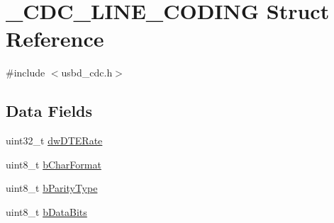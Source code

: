 \hypertarget{struct__CDC__LINE__CODING}{\section{\-\_\-\-C\-D\-C\-\_\-\-L\-I\-N\-E\-\_\-\-C\-O\-D\-I\-N\-G Struct Reference}
\label{struct__CDC__LINE__CODING}
}


{\ttfamily \#include $<$usbd\-\_\-cdc.\-h$>$}

\subsection*{Data Fields}
\begin{DoxyCompactItemize}
\item 
uint32\-\_\-t \hyperlink{struct__CDC__LINE__CODING_aeca9d053bfd185bc6b70911197442398}{dw\-D\-T\-E\-Rate}
\item 
uint8\-\_\-t \hyperlink{struct__CDC__LINE__CODING_a5c0251985f51927746b57e4c800ae9c7}{b\-Char\-Format}
\item 
uint8\-\_\-t \hyperlink{struct__CDC__LINE__CODING_a737b276dd2599610b3cf4783c80e725c}{b\-Parity\-Type}
\item 
uint8\-\_\-t \hyperlink{struct__CDC__LINE__CODING_a6764726aafd5b442bf5a1ecb39ffeb96}{b\-Data\-Bits}
\end{DoxyCompactItemize}


